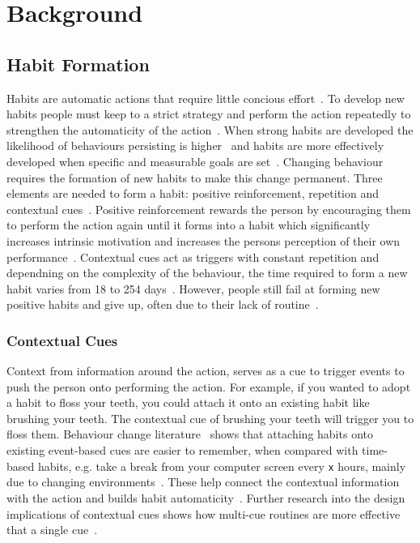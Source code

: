\newpage

\section{Background}

\subsection{Habit Formation}
Habits are automatic actions that require little concious effort~\cite{article_the_habitual_consumer}. To develop new habits people must keep to a strict strategy and perform the action repeatedly to strengthen the automaticity of the action~\cite{article_promoting_habit_formation}. When strong habits are developed the likelihood of behaviours persisting is higher~\cite{putting_habit_into_practice} and habits are more effectively developed when specific and measurable goals are set~\cite{habits_better_when_have_specific_and_measurable_goals}. Changing behaviour requires the formation of new habits to make this change permanent. Three elements are needed to form a habit: positive reinforcement, repetition and contextual cues~\cite{article_experiences_of_habit_formation}. Positive reinforcement rewards the person by encouraging them to perform the action again until it forms into a habit which significantly increases intrinsic motivation and increases the persons perception of their own performance~\cite{positive_reinforcement_pro}. Contextual cues act as triggers with constant repetition and dependning on the complexity of the behaviour, the time required to form a new habit varies from 18 to 254 days~\cite{article_how_habits_formed_modelling_habit_formation}.
However, people still fail at forming new positive habits and give up, often due to their lack of routine~\cite{article_the_habitual_consumer, article_promoting_habit_formation}.

\subsubsection*{Contextual Cues}
Context from information around the action, serves as a cue to trigger events to push the person onto performing the action. For example, if you wanted to adopt a habit to floss your teeth, you could attach it onto an existing habit like brushing your teeth. The contextual cue of brushing your teeth will trigger you to floss them. Behaviour change literature~\cite{article_implementation_intentions_multicue} shows that attaching habits onto existing event-based cues are easier to remember, when compared with time-based habits, e.g. take a break from your computer screen every \verb|x| hours, mainly due to changing environments~\cite{coaching_not_that_good}. These help connect the contextual information with the action and builds habit automaticity~\cite{article_implementation_intentions}. Further research into the design implications of contextual cues shows how multi-cue routines are more effective that a single cue~\cite{article_understanding_use_contextual_cues_design_impl}.

